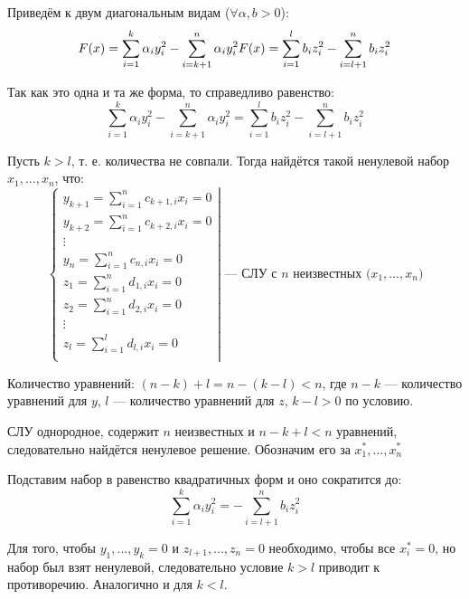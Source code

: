 \documentclass[12pt]{article}
\begin{document}
    Приведём к двум диагональным видам ($\forall \alpha, b > 0$):
    \[
        F(x) = \sum^k_{i=1}\alpha_{i}y_i^2 - \sum^n_{i=k + 1}\alpha_{i}y_i^2
        \\
        F(x) = \sum_{i=1}^lb_iz_i^2 - \sum_{i = l + 1}^nb_iz_i^2
    \]

    Так как это одна и та же форма, то справедливо равенство:
    \[
        \sum^k_{i=1}\alpha_{i}y_i^2 - \sum^n_{i=k + 1}\alpha_{i}y_i^2 = \sum_{i=1}^lb_iz_i^2 - \sum_{i = l + 1}^nb_iz_i^2
    \]

    Пусть $k > l$, т. е. количества не совпали. Тогда найдётся такой ненулевой набор $x_1, ..., x_n$, что:
    \[
        \left.\begin{cases}
            y_{k + 1} = \sum_{i = 1}^{n}c_{k + 1,i}x_i = 0 \\
            y_{k + 2} = \sum_{i = 1}^{n}c_{k + 2,i}x_i = 0 \\
            \vdots                                         \\
            y_{n} = \sum_{i = 1}^{n}c_{n,i}x_i = 0         \\
            z_{1} = \sum_{i = 1}^{n}d_{1,i}x_i = 0         \\
            z_{2} = \sum_{i = 1}^{n}d_{2,i}x_i = 0         \\
            \vdots                                         \\
            z_{l} = \sum_{i = 1}^{l}d_{l,i}x_i = 0         \\
        \end{cases}\right|
        \text{ — СЛУ с $n$ неизвестных ($x_1, ..., x_n$)}
    \]

    Количество уравнений: $(n - k) + l = n - (k - l) < n$, где $n - k$ — количество уравнений для $y$, $l$ — количество уравнений для $z$, $k - l > 0$ по условию.

    СЛУ однородное, содержит $n$ неизвестных и $n - k + l < n$ уравнений, следовательно найдётся ненулевое решение. Обозначим его за $x_1^*, ..., x_n^*$

    Подставим набор в равенство квадратичных форм и оно сократится до:
    \[
        \sum^k_{i=1}\alpha_{i}y_i^2 = -\sum_{i = l + 1}^nb_iz_i^2
    \]

    Для того, чтобы $y_{1}, ..., y_k = 0$ и $z_{l + 1}, ..., z_n = 0$ необходимо, чтобы все $x_i^* = 0$, но набор был взят ненулевой, следовательно условие $k > l$ приводит к противоречию. Аналогично и для $k < l$.
\end{document}
